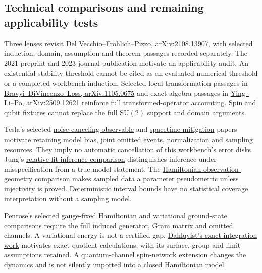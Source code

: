 \subsection{Technical comparisons and remaining applicability tests}
Three lenses revisit \href{https://arxiv.org/abs/2108.13907}{Del Vecchio--Fr\"ohlich--Pizzo, arXiv:2108.13907}, with selected induction, domain, assumption and theorem passages recorded separately. The 2021 preprint and 2023 journal publication motivate an applicability audit. An existential stability threshold cannot be cited as an evaluated numerical threshold or a completed workbench induction. Selected local-transformation passages in \href{https://arxiv.org/abs/1105.0675}{Bravyi--DiVincenzo--Loss, arXiv:1105.0675} and exact-algebra passages in \href{https://arxiv.org/abs/2509.12621}{Ying--Li--Po, arXiv:2509.12621} reinforce full transformed-operator accounting. Spin and qubit fixtures cannot replace the full $\mathrm{SU}(2)$ support and domain arguments.

Tesla's selected \href{https://arxiv.org/html/2606.20441v1}{noise-canceling observable} and \href{https://arxiv.org/html/2609.13108v1}{spacetime mitigation} papers motivate retaining model bias, joint omitted events, normalization and sampling resources. They imply no automatic cancellation of this workbench's error disks. Jung's \href{https://academic.oup.com/biomet/article/113/2/asaf070/8321921}{relative-fit inference comparison} distinguishes inference under misspecification from a true-model statement. The \href{https://arxiv.org/html/2608.10350v1}{Hamiltonian observation-geometry comparison} makes sampled data a parameter pseudometric unless injectivity is proved. Deterministic interval bounds have no statistical coverage interpretation without a sampling model.

Penrose's selected \href{https://arxiv.org/abs/2409.10610}{gauge-fixed Hamiltonian} and \href{https://arxiv.org/abs/2509.12323}{variational ground-state} comparisons require the full induced generator, Gram matrix and omitted channels. A variational energy is not a certified gap. \href{https://arxiv.org/pdf/2603.11374v2}{Dahlqvist's exact integration work} motivates exact quotient calculations, with its surface, group and limit assumptions retained. A \href{https://arxiv.org/html/2602.12145v1}{quantum-channel spin-network extension} changes the dynamics and is not silently imported into a closed Hamiltonian model.


